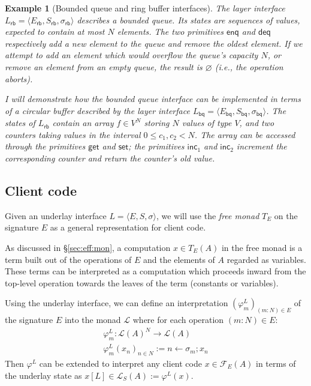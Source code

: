 \documentclass[11pt,oneside,draft]{book}
\newtheorem{example}[theorem]{Example}
\theoremstyle{definition}
\newcommand{\kw}[1]{\ensuremath{ \mathsf{#1} }}
\begin{document}
\begin{example}[Bounded queue and ring buffer interfaces] %
The layer interface
$L_\kw{rb} = \langle E_\kw{rb}, S_\kw{rb}, \sigma_\kw{rb} \rangle$
describes a bounded queue.
Its states are sequences of values,
expected to contain at most $N$ elements.
The two primitives
$\kw{enq}$ and $\kw{deq}$
respectively add a new element to the queue
and remove the oldest element.
If we attempt to add an element
which would overflow the queue's capacity $N$,
or remove an element from an empty queue,
the result is $\varnothing$ (i.e., the operation aborts).

I will demonstrate how the bounded queue interface
can be implemented in terms of a circular buffer
described by the layer interface
$L_\kw{bq} = \langle E_\kw{bq}, S_\kw{bq}, \sigma_\kw{bq} \rangle$.
The states of $L_\kw{rb}$
contain an array $f \in V^N$
storing $N$ values of type $V$,
and two counters
taking values in the interval $0 \le c_1, c_2 < N$.
The array can be accessed through the primitives
$\kw{get}$ and $\kw{set}$;
the primitives $\kw{inc}_1$ and $\kw{inc}_2$
increment the corresponding counter
and return the counter's old value.
\end{example}


\subsection{Client code} %

Given an underlay interface $L = \langle E, S, \sigma \rangle$,
we will use the \emph{free monad} $T_E$ on the signature $E$
as a general representation for client code.

As discussed in \S\ref{sec:eff:mon},
a computation $x \in T_E(A)$ in the free monad
is a term built out of the operations of $E$ and
the elements of $A$ regarded as variables.
These terms can be interpreted as a computation which proceeds inward
from the top-level operation
towards the leaves of the term (constants or variables).

Using the underlay interface,
we can define an interpretation
$(\varphi^L_m)_{(m \mathop: N) \in E}$
of the signature $E$ into the monad $\mathcal{L}$
where for each operation $(m \mathop: N) \in E$:
\begin{gather*}
  \varphi^L_m : \mathcal{L}(A)^N \rightarrow \mathcal{L}(A) \\
  \varphi^L_m(x_n)_{n \in N} :=
    n \mathop{\leftarrow} \sigma_m \mathop{;} x_n
\end{gather*}
Then $\varphi^L$ can be extended to
interpret any client code $x \in \mathcal{F}_E(A)$
in terms of the underlay state
as $x[L] \in \mathcal{L}_S(A) := \varphi^L(x)$.
\end{document}
